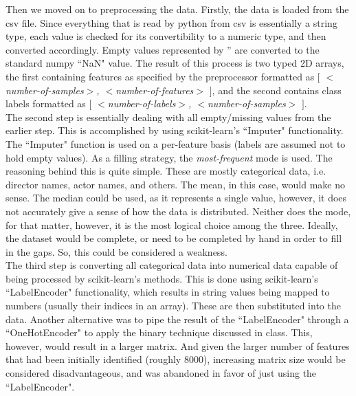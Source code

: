 \documentclass[journal,transmag]{IEEEtran}
\begin{document}
Then we moved on to preprocessing the data. Firstly, the data is loaded from the csv file. Since everything that is read by python from csv is essentially a string type, each value is checked for its convertibility to a numeric type, and then converted accordingly. Empty values represented by '' are converted to the standard numpy ``NaN" value. The result of this process is two typed 2D arrays, the first containing features as specified by the preprocessor formatted as $[$ \textit{$<$number-of-samples$>$, $<$number-of-features$>$} $]$, and the second contains class labels formatted as $[$ \textit{$<$number-of-labels$>$, $<$number-of-samples$>$} $] $.\\
The second step is essentially dealing with all empty/missing values from the earlier step. This is accomplished by using scikit-learn’s ``Imputer" functionality. The ``Imputer" function is used on a per-feature basis (labels are assumed not to hold empty values). As a filling strategy, the \textit{most-frequent} mode is used. The reasoning behind this is quite simple. These are mostly categorical data, i.e. director names, actor names, and others. The mean, in this case, would make no sense. The median could be used, as it represents a single value, however, it does not accurately give a sense of how the data is distributed. Neither does the mode, for that matter, however, it is the most logical choice among the three. Ideally, the dataset would be complete, or need to be completed by hand in order to fill in the gaps. So, this could be considered a weakness.\\
The third step is converting all categorical data into numerical data capable of being processed by scikit-learn’s methods. This is done using scikit-learn’s ``LabelEncoder" functionality, which results in string values being mapped to numbers (usually their indices in an array). These are then substituted into the data. Another alternative was to pipe the result of the ``LabelEncoder" through a ``OneHotEncoder" to apply the binary technique discussed in class. This, however, would result in a larger matrix. And given the larger number of features that had been initially identified (roughly 8000), increasing matrix size would be considered disadvantageous, and was abandoned in favor of just using the ``LabelEncoder".
\end{document}
